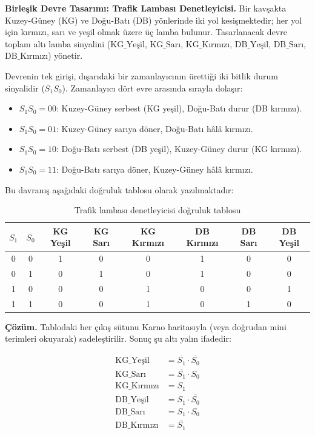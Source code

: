 \begin{ornek}[B.13]
\textbf{Birleşik Devre Tasarımı: Trafik Lambası Denetleyicisi.}
Bir kavşakta Kuzey-Güney (KG) ve Doğu-Batı (DB) yönlerinde iki yol kesişmektedir; her yol için kırmızı, sarı ve yeşil olmak üzere üç lamba bulunur. Tasarlanacak devre toplam altı lamba sinyalini ($\text{KG\_Yeşil}$, $\text{KG\_Sarı}$, $\text{KG\_Kırmızı}$, $\text{DB\_Yeşil}$, $\text{DB\_Sarı}$, $\text{DB\_Kırmızı}$) yönetir.

Devrenin tek girişi, dışarıdaki bir zamanlayıcının ürettiği iki bitlik durum sinyalidir ($S_1 S_0$). Zamanlayıcı dört evre arasında sırayla dolaşır:
\begin{itemize}[nosep]
  \item $S_1 S_0 = 00$: Kuzey-Güney serbest (KG yeşil), Doğu-Batı durur (DB kırmızı).
  \item $S_1 S_0 = 01$: Kuzey-Güney sarıya döner, Doğu-Batı hâlâ kırmızı.
  \item $S_1 S_0 = 10$: Doğu-Batı serbest (DB yeşil), Kuzey-Güney durur (KG kırmızı).
  \item $S_1 S_0 = 11$: Doğu-Batı sarıya döner, Kuzey-Güney hâlâ kırmızı.
\end{itemize}

Bu davranış aşağıdaki doğruluk tablosu olarak yazılmaktadır:

\begin{table}[H]
\centering
\caption*{Trafik lambası denetleyicisi doğruluk tablosu}
\small
\begin{tabular}{cc|ccc|ccc}
\toprule
$S_1$ & $S_0$ & KG Yeşil & KG Sarı & KG Kırmızı & DB Kırmızı & DB Sarı & DB Yeşil \\
\midrule
0 & 0 & 1 & 0 & 0 & 1 & 0 & 0 \\
0 & 1 & 0 & 1 & 0 & 1 & 0 & 0 \\
1 & 0 & 0 & 0 & 1 & 0 & 0 & 1 \\
1 & 1 & 0 & 0 & 1 & 0 & 1 & 0 \\
\bottomrule
\end{tabular}
\end{table}

\textbf{Çözüm.} Tablodaki her çıkış sütunu Karno haritasıyla (veya doğrudan mini terimleri okuyarak) sadeleştirilir. Sonuç şu altı yalın ifadedir:

\[
\begin{aligned}
\text{KG\_Yeşil}    &= \overline{S_1} \cdot \overline{S_0} \\
\text{KG\_Sarı}     &= \overline{S_1} \cdot S_0 \\
\text{KG\_Kırmızı}  &= S_1 \\
\text{DB\_Yeşil}    &= S_1 \cdot \overline{S_0} \\
\text{DB\_Sarı}     &= S_1 \cdot S_0 \\
\text{DB\_Kırmızı}  &= \overline{S_1}
\end{aligned}
\]


\end{ornek}
